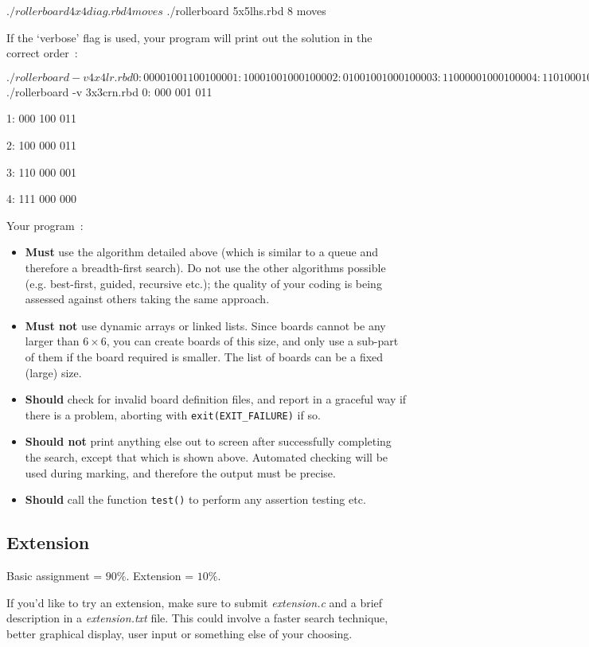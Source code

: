 \begin{exercise}
\begin{terminaloutput}
$ ./rollerboard 4x4diag.rbd
4 moves
$ ./rollerboard 5x5lhs.rbd
8 moves
\end{terminaloutput}


If the `verbose' flag is used, your program will print out the solution in the correct order~:
\begin{terminaloutput}
$ ./rollerboard -v 4x4lr.rbd
0:
0000
1001
1001
0000

1:
1000
1001
0001
0000

2:
0100
1001
0001
0000

3:
1100
0001
0001
0000

4:
1101
0001
0000
0000

5:
1110
0001
0000
0000

6:
1111
0000
0000
0000 

$ ./rollerboard -v 3x3crn.rbd
0:
000
001
011

1:
000
100
011

2:
100
000
011

3:
110
000
001

4:
111
000
000

\end{terminaloutput}

\noindent
Your program~:
\begin{itemize}
\item {\bf Must} use the algorithm detailed above (which is similar to a queue and therefore a breadth-first search). Do not use the other algorithms possible (e.g. best-first, guided, recursive etc.); the quality of your coding is being assessed against others taking the same approach.
\item {\bf Must not} use dynamic arrays or linked lists. Since boards cannot be any larger than $6 \times 6$, you can create boards of this size, and only use a sub-part of them if the board required is smaller. The list of boards can be a fixed (large) size.
\item {\bf Should} check for invalid board definition files, and report in a graceful way if there is a problem, aborting with \verb^exit(EXIT_FAILURE)^ if so.
\item {\bf Should not} print anything else out to screen after successfully
completing the search, except that which is shown above. Automated checking
will be used during marking, and therefore the output must be precise.
\item {\bf Should} call the function \verb^test()^ to perform any assertion testing etc.
\end{itemize}


\subsection*{Extension}

Basic assignment = {\Large $90\%$}.
Extension = {\Large $10\%$}.

\noindent
If you'd like to try an extension, make sure to submit {\it extension.c}
and a brief description in a {\it extension.txt} file. This could
involve a faster search technique, better graphical display, user input
or something else of your choosing.

\end{exercise}
